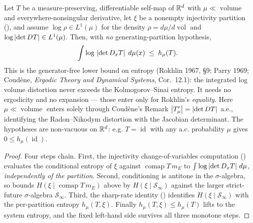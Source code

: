 \begin{theorem}\label{integral_log_abs_det_le_ksEntropy}
  \leanok
  Let \(T\) be a measure-preserving, differentiable self-map of \(\mathbb{R}^d\) with
  \(\mu\ll\operatorname{volume}\) and everywhere-nonsingular derivative, let \(\xi\) be a nonempty
  injectivity partition (), and assume \(\log\rho\in L^1(\mu)\) for the
  density \(\rho=d\mu/d\operatorname{vol}\) and \(\log\left\lvert \det DT \right\rvert\in L^1(\mu)\). Then, with
  \emph{no} generating-partition hypothesis,
  \[
    \int \log\,\left\lvert \det D_xT \right\rvert\;d\mu(x) \;\le\; h_\mu(T) .
  \]
  This is the generator-free lower bound on entropy (Rokhlin 1967, \S9; Parry 1969; Coud\`ene,
  \emph{Ergodic Theory and Dynamical Systems}, Cor.~12.1): the integrated log volume distortion
  never exceeds the Kolmogorov--Sinai entropy. It needs no ergodicity and no expansion --- those
  enter only for Rokhlin's \emph{equality}. Here \(\mu\ll\operatorname{volume}\) enters solely
  through Coud\`ene's Remark \(\left\lvert T'_\mu \right\rvert=\left\lvert \det DT \right\rvert\) a.e., identifying the Radon--Nikodym
  distortion with the Jacobian determinant. The hypotheses are non-vacuous on \(\mathbb{R}^d\): e.g.
  \(T=\operatorname{id}\) with any a.c. probability \(\mu\) gives \(0\le h_\mu(\operatorname{id})\).
\end{theorem}
\begin{proof}\leanok
  Four steps chain. First, the injectivity change-of-variables computation
  () evaluates the conditional entropy of \(\xi\)
  against \(\operatorname{comap}T\,m_E\) to \(\int\log\left\lvert \det D_xT \right\rvert\,d\mu\), \emph{independently of
  the partition}. Second, conditioning is antitone in the \(\sigma\)-algebra, so
   bounds \(H(\xi\mid\operatorname{comap}T\,m_E)\) above by
  \(H(\xi\mid\mathcal S_\infty)\) against the larger strict-future \(\sigma\)-algebra
  \(\mathcal S_\infty\). Third, the sharp-rate identity
  () identifies \(H(\xi\mid\mathcal S_\infty)\) with
  the per-partition entropy \(h_\mu(T,\xi)\). Finally \(h_\mu(T,\xi)\le h_\mu(T)\) lifts to the
  system entropy, and the fixed left-hand side survives all three monotone steps.
\end{proof}

